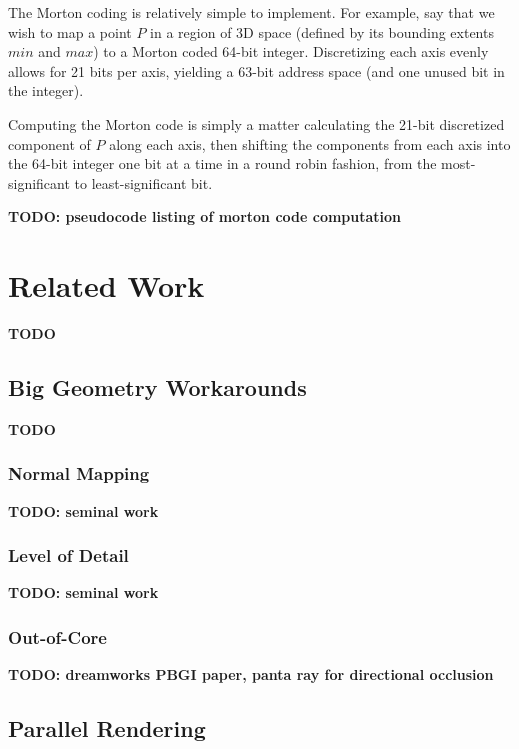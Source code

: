 \documentclass[12pt]{ucthesis}
\begin{document}
The Morton coding is relatively simple to implement. For example, say that
we wish to map a point $P$ in a region of 3D space (defined by its bounding extents
$min$ and $max$) to a Morton coded 64-bit integer. Discretizing each axis evenly
allows for 21 bits per axis, yielding a 63-bit address space (and one unused bit
in the integer).

Computing the Morton code is simply a matter calculating the 21-bit discretized
component of $P$ along each axis, then shifting the components from each axis
into the 64-bit integer one bit at a time in a round robin fashion, from the
most-significant to least-significant bit.

\textbf{TODO: pseudocode listing of morton code computation}

\chapter{Related Work}
\label{relatedwork}

\textbf{TODO}

\section{Big Geometry Workarounds}
\label{managingcomplexity}

\textbf{TODO}

\subsection{Normal Mapping}
\label{normalmaps}

\textbf{TODO: seminal work}

\subsection{Level of Detail}
\label{levelofdetail}

\textbf{TODO: seminal work}

\subsection{Out-of-Core}
\label{outofcore}

\textbf{TODO: dreamworks PBGI paper, panta ray for directional occlusion}

\section{Parallel Rendering}
\label{parallelbg}
\end{document}
